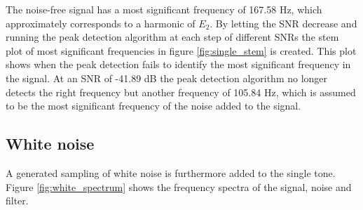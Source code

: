 \newpage
The noise-free signal has a most significant frequency of 167.58 Hz, which approximately corresponds to a harmonic of $E_2$. By letting the SNR decrease and running the peak detection algorithm at each step of different SNRs the stem plot of most significant frequencies in figure \ref{fig:single_stem} is created. This plot shows when the peak detection fails to identify the most significant frequency in the signal. At an SNR of -41.89 dB the peak detection algorithm no longer detects the right frequency but another frequency of 105.84 Hz, which is assumed to be the most significant frequency of the noise added to the signal.

\subsection{White noise}
A generated sampling of white noise is furthermore added to the single tone. Figure \ref{fig:white_spectrum} shows the frequency spectra of the signal, noise and filter.

